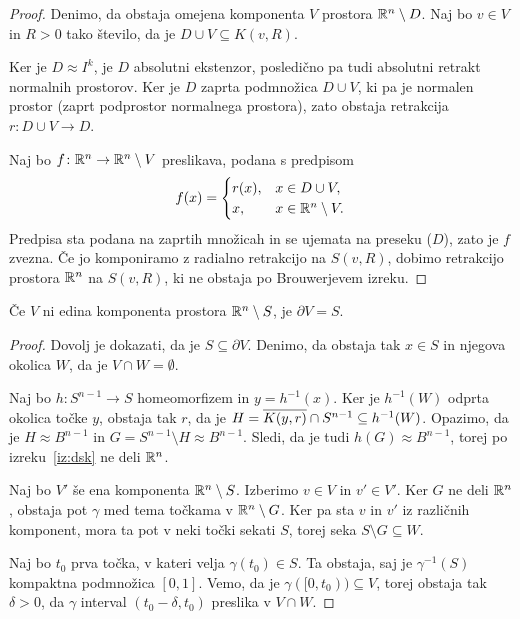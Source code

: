 \begin{proof}
Denimo, da obstaja omejena komponenta $V$ prostora
$\mathbb{R}^n \setminus D$. Naj bo $v \in V$ in $R > 0$ tako število, da je
$D \cup V \subseteq K(v, R)$.

Ker je $D \approx I^k$, je $D$ absolutni ekstenzor, posledično pa
tudi absolutni retrakt normalnih prostorov. Ker je $D$ zaprta
podmnožica $D \cup V$, ki pa je normalen prostor (zaprt podprostor
normalnega prostora), zato obstaja retrakcija
$r \colon D \cup V \to D$.

Naj bo $f \colon \mathbb{R}^n \to \mathbb{R}^n \setminus V$ preslikava, podana s
predpisom
\[
f(x) = \begin{cases}
r(x), & x \in D \cup V, \\
x,    & x \in \mathbb{R}^n \setminus V.
\end{cases}
\]
Predpisa sta podana na zaprtih množicah in se ujemata na preseku
($D$), zato je $f$ zvezna. Če jo komponiramo z radialno retrakcijo
na $S(v, R)$, dobimo retrakcijo prostora $\mathbb{R}^n$ na $S(v, R)$, ki ne
obstaja po Brouwerjevem izreku.
\end{proof}

\begin{lema}
Če $V$ ni edina komponenta prostora $\mathbb{R}^n \setminus S$, je
$\partial V = S$.
\end{lema}

\begin{proof}
Dovolj je dokazati, da je $S \subseteq \partial V$. Denimo, da
obstaja tak $x \in S$ in njegova okolica $W$, da je
$V \cap W = \emptyset$.

Naj bo $h \colon S^{n-1} \to S$ homeomorfizem in $y = h^{-1}(x)$.
Ker je $h^{-1}(W)$ odprta okolica točke $y$, obstaja tak $r$, da je
$H = \overline{K(y, r)} \cap S^{n-1} \subseteq h^{-1}(W)$. Opazimo, da
je $H \approx B^{n-1}$ in
$G = S^{n-1} \setminus H \approx B^{n-1}$. Sledi, da je tudi
$h(G) \approx B^{n-1}$, torej po izreku~\ref{iz:dsk} ne deli
$\mathbb{R}^n$.

Naj bo $V'$ še ena komponenta $\mathbb{R}^n \setminus S$. Izberimo
$v \in V$ in $v' \in V'$. Ker $G$ ne deli $\mathbb{R}^n$, obstaja pot
$\gamma$ med tema točkama v $\mathbb{R}^n \setminus G$. Ker pa sta $v$ in
$v'$ iz različnih komponent, mora ta pot v neki točki sekati $S$,
torej seka $S \setminus G \subseteq W$.

Naj bo $t_0$ prva točka, v kateri velja $\gamma(t_0) \in S$. Ta
obstaja, saj je $\gamma^{-1}(S)$ kompaktna podmnožica $[0, 1]$.
Vemo, da je $\gamma([0, t_0)) \subseteq V$, torej obstaja tak
$\delta > 0$, da $\gamma$ interval $(t_0 - \delta, t_0)$ preslika v
$V \cap W$.
\end{proof}

